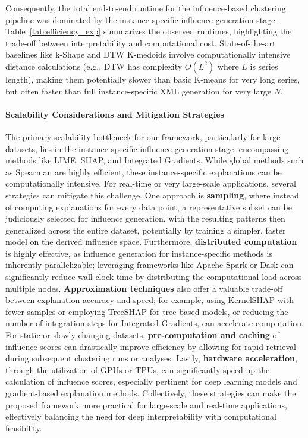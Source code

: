 \documentclass[final,authoryear,3p,times,review,sort&compress]{elsarticle}
\begin{document}
Consequently, the total end-to-end runtime for the influence-based clustering pipeline was dominated by the instance-specific influence generation stage. Table~\ref{tab:efficiency_exp} summarizes the observed runtimes, highlighting the trade-off between interpretability and computational cost. State-of-the-art baselines like k-Shape and DTW K-medoids involve computationally intensive distance calculations (e.g., DTW has complexity $O(L^2)$ where $L$ is series length), making them potentially slower than basic K-means for very long series, but often faster than full instance-specific XML generation for very large $N$.

\paragraph{Scalability Considerations and Mitigation Strategies} The primary scalability bottleneck for our framework, particularly for large datasets, lies in the instance-specific influence generation stage, encompassing methods like LIME, SHAP, and Integrated Gradients. While global methods such as Spearman are highly efficient, these instance-specific explanations can be computationally intensive. For real-time or very large-scale applications, several strategies can mitigate this challenge. One approach is \textbf{sampling}, where instead of computing explanations for every data point, a representative subset can be judiciously selected for influence generation, with the resulting patterns then generalized across the entire dataset, potentially by training a simpler, faster model on the derived influence space. Furthermore, \textbf{distributed computation} is highly effective, as influence generation for instance-specific methods is inherently parallelizable; leveraging frameworks like Apache Spark or Dask can significantly reduce wall-clock time by distributing the computational load across multiple nodes. \textbf{Approximation techniques} also offer a valuable trade-off between explanation accuracy and speed; for example, using KernelSHAP with fewer samples or employing TreeSHAP for tree-based models, or reducing the number of integration steps for Integrated Gradients, can accelerate computation. For static or slowly changing datasets, \textbf{pre-computation and caching} of influence scores can drastically improve efficiency by allowing for rapid retrieval during subsequent clustering runs or analyses. Lastly, \textbf{hardware acceleration}, through the utilization of GPUs or TPUs, can significantly speed up the calculation of influence scores, especially pertinent for deep learning models and gradient-based explanation methods. Collectively, these strategies can make the proposed framework more practical for large-scale and real-time applications, effectively balancing the need for deep interpretability with computational feasibility.
\end{document}
